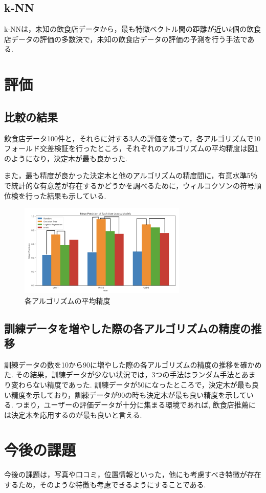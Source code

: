 \documentclass[9pt,twocolumn]{jsarticle}
\begin{document}
\subsection{k-NN}
k-NNは，未知の飲食店データから，最も特徴ベクトル間の距離が近い\( k \)個の飲食店データの評価の多数決で，未知の飲食店データの評価の予測を行う手法である.
\section{評価}

\subsection{比較の結果}
飲食店データ100件と，それらに対する3人の評価を使って，各アルゴリズムで10フォールド交差検証を行ったところ，それぞれのアルゴリズムの平均精度は図\ref{fig7}のようになり，決定木が最も良かった.

また，最も精度が良かった決定木と他のアルゴリズムの精度間に，有意水準5％で統計的な有意差が存在するかどうかを調べるために，ウィルコクソンの符号順位検を行った結果も示している.

\begin{figure}[htbp]
    \begin{center}
      \includegraphics[width=8cm]{image/fig7.png}
      \caption{各アルゴリズムの平均精度}
      \label{fig7}
    \end{center}
\end{figure}

\subsection{訓練データを増やした際の各アルゴリズムの精度の推移}
訓練データの数を10から90に増やした際の各アルゴリズムの精度の推移を確かめた.
その結果，訓練データが少ない状況では，3つの手法はランダム手法とあまり変わらない精度であった.
訓練データが50になったところで，決定木が最も良い精度を示しており，訓練データが90の時も決定木が最も良い精度を示している.
つまり，ユーザーの評価データが十分に集まる環境であれば, 飲食店推薦には決定木を応用するのが最も良いと言える.

\section{今後の課題}
今後の課題は，写真や口コミ，位置情報といった，他にも考慮すべき特徴が存在するため，そのような特徴も考慮できるようにすることである.


\end{document}
